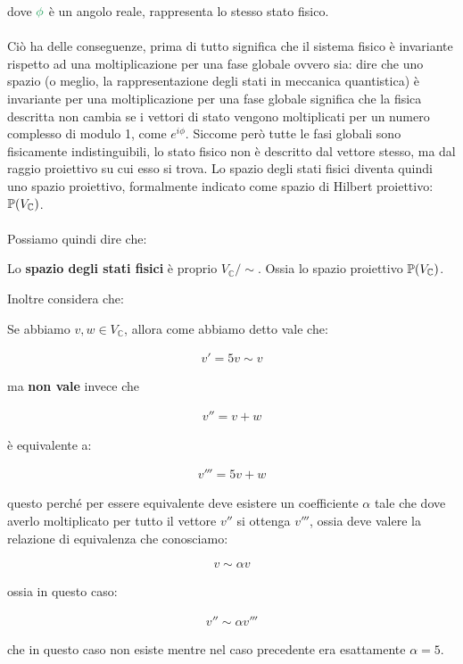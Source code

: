 	dove $\textcolor{ForestGreen}{\phi}$ è un angolo reale, rappresenta lo stesso stato fisico.
	\\
	\\
	Ciò ha delle conseguenze, prima di tutto significa che il sistema fisico è invariante rispetto ad una moltiplicazione per una fase globale ovvero sia: dire che uno spazio (o meglio, la rappresentazione degli stati in meccanica quantistica) è invariante per una moltiplicazione per una fase globale significa che la fisica descritta non cambia se i vettori di stato vengono moltiplicati per un numero complesso di modulo 1, come $e^{i\phi}$. Siccome però tutte le fasi globali sono fisicamente indistinguibili, lo stato fisico non è descritto dal vettore stesso, ma dal raggio proiettivo su cui esso si trova. Lo spazio degli stati fisici diventa quindi uno spazio proiettivo, formalmente indicato come spazio di Hilbert proiettivo: $\mathbb{P}\qty(V_{\mathbb{C}})$.
	\\
	\\
	Possiamo quindi dire che: 
	
\begin{nb}
	Lo \textbf{spazio degli stati fisici} è proprio $V_{\mathbb{C}}/\sim$. Ossia lo spazio proiettivo $\mathbb{P}\qty(V_{\mathbb{C}})$.
\end{nb}

	Inoltre considera che:
	
\begin{nb}
	Se abbiamo $v, w \in V_{\mathbb{C}}$, allora come abbiamo detto vale che:
	
	\begin{align*}
		v' = 5 v \sim v
	\end{align*}
	
		ma \textbf{non vale} invece che
		
	\begin{align*}
		v'' = v + w
	\end{align*}
		
		è equivalente a:
		
	\begin{align*}
		v''' = 5v + w
	\end{align*}
	
		questo perché per essere equivalente deve esistere un coefficiente $\alpha$ tale che dove averlo moltiplicato per tutto il vettore $v''$ si ottenga $v'''$, ossia deve valere la relazione di equivalenza che conosciamo:
		
	\begin{align*}
		v \sim \alpha v
	\end{align*}
	
		ossia in questo caso:
		
	\begin{align*}
		v'' \sim \alpha v'''
	\end{align*}
	
		che in questo caso non esiste mentre nel caso precedente era esattamente $\alpha = 5$.

\end{nb}

